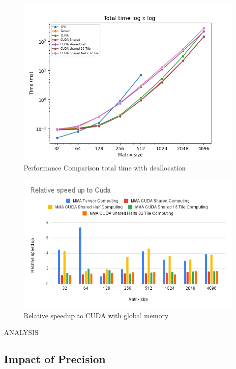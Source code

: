 \documentclass[conference]{IEEEtran}
\begin{document}
  \begin{figure}[htbp]
    \centering
    \includegraphics[scale=0.4]{figures/Tot_time_dealloc.png}
    \caption{Performance Comparison total time with deallocation}
    \label{fig:time-comparison}
  \end{figure}



  \begin{figure}[htbp]
    \centering
    \includegraphics[scale=0.38]{figures/Relative speed up to Cuda.png}
    \caption{Relative speedup to CUDA with global memory}
    \label{fig:performance-comparison}
  \end{figure}
  
  ANALYSIS
  
  \subsection{Impact of Precision}\label{sec:impact-precision}
  
\end{document}
